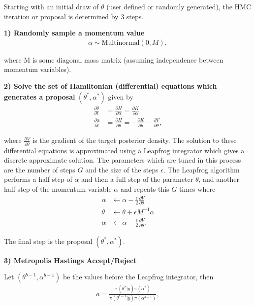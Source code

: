 \documentclass[12pt, a4paper]{article}
\begin{document}
Starting with an initial draw of $\theta$ (user defined or randomly generated), the HMC iteration or proposal is determined by 3 steps.

\textbf{1) Randomly sample a momentum value}
\begin{align}
\alpha\sim \mathrm{Multinormal}(0, M),
\end{align}

where M is some diagonal mass matrix (assuming independence between momentum variables).

\textbf{2) Solve the set of Hamiltonian (differential) equations which generates a proposal} $(\theta^{\ast}, \alpha^{\ast})$ given by
\begin{align}
\frac{\partial \theta}{\partial t} &= \frac{\partial H}{\partial \alpha} = \frac{\partial K}{\partial \alpha} \\
\frac{\partial \alpha}{\partial t} &= \frac{\partial H}{\partial \theta} = - \frac{\partial K}{\partial \theta} - \frac{\partial V}        {\partial \theta},
\end{align}

where $\frac{\partial V}{\partial \theta}$ is the gradient of the target posterior density. The solution to these differential equations is approximated using a Leapfrog integrator which gives a discrete approximate solution. The parameters which are tuned in this process are the number of steps $G$ and the size of the steps $\epsilon$. The Leapfrog algorithm performs a half step of $\alpha$ and then a full step of the parameter $\theta$, and another half step of the momentum variable $\alpha$ and repeats this $G$ times where
\begin{align}
\alpha &\leftarrow \alpha - \frac{\epsilon}{2} \frac{\partial V}{\partial \theta} \\
\theta &\leftarrow \theta + \epsilon M^{-1} \alpha \\
\alpha &\leftarrow \alpha - \frac{\epsilon}{2} \frac{\partial V}{\partial \theta}.
\end{align}

The final step is the proposal $(\theta^{\ast}, \alpha^{\ast})$.

\textbf{3) Metropolis Hastings Accept/Reject}

Let $(\theta^{b-1}, \alpha^{b-1})$ be the values before the Leapfrog integrator, then
\begin{align}
a = \frac{\pi(\theta^{\ast} | y) \pi(\alpha^{\ast})}{\pi(\theta^{b-1} | y) \pi(\alpha^{b-1})},
\end{align}
\end{document}
